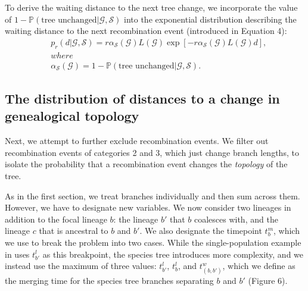 \documentclass[11pt]{article}
\begin{document}
To derive the waiting distance to the next tree change, we incorporate the value of $1-\mathbb{P}(\textrm{tree unchanged} | \mathcal{G},\mathcal{S})$ into the exponential distribution describing the waiting distance to the next recombination event (introduced in Equation 4):
\begin{equation}
\begin{aligned}
	&p_r(d|\mathcal{G},\mathcal{S}) = r\alpha_\mathcal{S}(\mathcal{G})L(\mathcal{G})\exp\left[-r\alpha_\mathcal{S}(\mathcal{G})L(\mathcal{G})d\right]\textrm{,} \\
	&where \\
	&\alpha_\mathcal{S}(\mathcal{G})=1-\mathbb{P}(\textrm{tree unchanged} | \mathcal{G},\mathcal{S}).
\end{aligned}
\end{equation}

\subsection{The distribution of distances to a change in genealogical topology}

Next, we attempt to further exclude recombination events. We filter out recombination events of categories 2 and 3, which just change branch lengths, to isolate the probability that a recombination event changes the \emph{topology} of the tree.

As in the first section, we treat branches individually and then sum across them. However, we have to designate new variables. We now consider two lineages in addition to the focal lineage $b$: the lineage $b'$ that $b$ coalesces with, and the lineage $c$ that is ancestral to $b$ and $b'$. We also designate the timepoint $t_b^m$, which we use to break the problem into two cases. While the single-population example in \citet{deng_distribution_2021} uses $t_{b'}^l$ as this breakpoint, the species tree introduces more complexity, and we instead use the maximum of three values: $t_{b'}^l$, $t_{b}^l$, and $t_{(b,b')}^w$, which we define as the merging time for the species tree branches separating $b$ and $b'$ (Figure 6).
\end{document}
